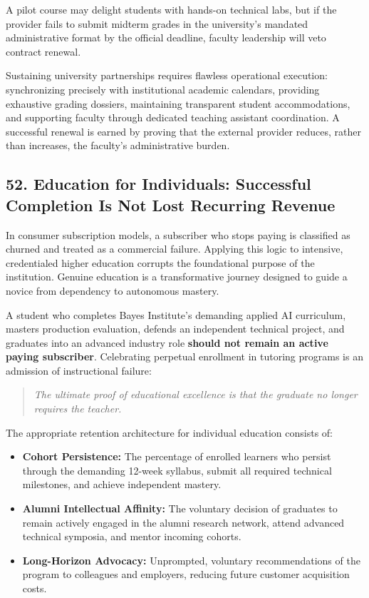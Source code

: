 A pilot course may delight students with hands-on technical labs, but if the provider fails to submit midterm grades in the university's mandated administrative format by the official deadline, faculty leadership will veto contract renewal. 

Sustaining university partnerships requires flawless operational execution: synchronizing precisely with institutional academic calendars, providing exhaustive grading dossiers, maintaining transparent student accommodations, and supporting faculty through dedicated teaching assistant coordination. A successful renewal is earned by proving that the external provider reduces, rather than increases, the faculty's administrative burden.

\subsection*{52. Education for Individuals: Successful Completion Is Not Lost Recurring Revenue}

In consumer subscription models, a subscriber who stops paying is classified as churned and treated as a commercial failure. Applying this logic to intensive, credentialed higher education corrupts the foundational purpose of the institution. Genuine education is a transformative journey designed to guide a novice from dependency to autonomous mastery.

A student who completes Bayes Institute's demanding applied AI curriculum, masters production evaluation, defends an independent technical project, and graduates into an advanced industry role \textbf{should not remain an active paying subscriber}. Celebrating perpetual enrollment in tutoring programs is an admission of instructional failure:
\begin{quote}
\textit{The ultimate proof of educational excellence is that the graduate no longer requires the teacher.}
\end{quote}
The appropriate retention architecture for individual education consists of:
\begin{itemize}[leftmargin=*]
\item \textbf{Cohort Persistence:} The percentage of enrolled learners who persist through the demanding 12-week syllabus, submit all required technical milestones, and achieve independent mastery.
\item \textbf{Alumni Intellectual Affinity:} The voluntary decision of graduates to remain actively engaged in the alumni research network, attend advanced technical symposia, and mentor incoming cohorts.
\item \textbf{Long-Horizon Advocacy:} Unprompted, voluntary recommendations of the program to colleagues and employers, reducing future customer acquisition costs.
\end{itemize}

